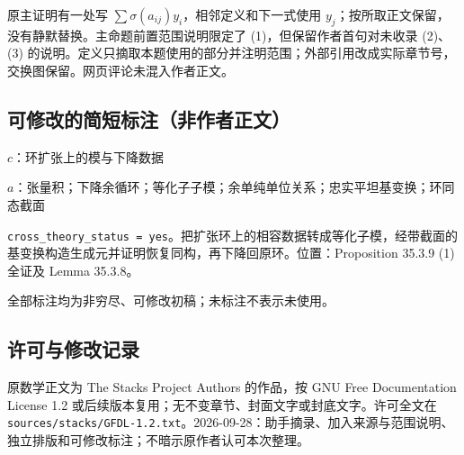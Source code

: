 \documentclass[UTF8,11pt]{ctexart}
\theoremstyle{definition}
\begin{document}
原主证明有一处写 $\sum\sigma(a_{ij})y_i$，相邻定义和下一式使用 $y_j$；按所取正文保留，没有静默替换。主命题前置范围说明限定了 (1)，但保留作者首句对未收录 (2)、(3) 的说明。定义只摘取本题使用的部分并注明范围；外部引用改成实际章节号，交换图保留。网页评论未混入作者正文。
\subsection*{可修改的简短标注（非作者正文）}
$c$：环扩张上的模与下降数据

$a$：张量积；下降余循环；等化子子模；余单纯单位关系；忠实平坦基变换；环同态截面

\texttt{cross\_theory\_status = yes}。把扩张环上的相容数据转成等化子模，经带截面的基变换构造生成元并证明恢复同构，再下降回原环。位置：Proposition 35.3.9 (1) 全证及 Lemma 35.3.8。

全部标注均为非穷尽、可修改初稿；未标注不表示未使用。
\subsection*{许可与修改记录}
原数学正文为 The Stacks Project Authors 的作品，按 GNU Free Documentation License 1.2 或后续版本复用；无不变章节、封面文字或封底文字。许可全文在 \texttt{sources/stacks/GFDL-1.2.txt}。2026-09-28：助手摘录、加入来源与范围说明、独立排版和可修改标注；不暗示原作者认可本次整理。
\end{document}
